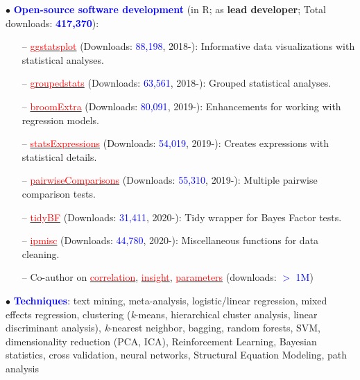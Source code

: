 \documentclass[10pt]{article}
\begin{document}
	$\bullet$ \textcolor{blue}{\textbf{Open-source software development}} (in R; as \textbf{lead developer}; Total downloads: \textcolor{blue}{\textbf{417,370}}):
	 \vspace*{-0.09in}
	 
	\begin{itemize}
	\itemsep-0.1em
	\item[--] \href{https://indrajeetpatil.github.io/ggstatsplot/}{\textcolor{red}{ggstatsplot}} (Downloads: \textcolor{blue}{88,198}, 2018-): Informative data visualizations with statistical analyses.
	\item[--] \href{https://indrajeetpatil.github.io/groupedstats/}{\textcolor{red}{groupedstats}} (Downloads: \textcolor{blue}{63,561}, 2018-): Grouped statistical analyses.
	\item[--] \href{https://indrajeetpatil.github.io/groupedstats/}{\textcolor{red}{broomExtra}} (Downloads: \textcolor{blue}{80,091}, 2019-): Enhancements for working with regression models.
	\item[--] \href{https://indrajeetpatil.github.io/statsExpressions/}{\textcolor{red}{statsExpressions}} (Downloads: \textcolor{blue}{54,019}, 2019-): Creates expressions with statistical details.
	\item[--] \href{https://indrajeetpatil.github.io/pairwiseComparisons/}{\textcolor{red}{pairwiseComparisons}} (Downloads: \textcolor{blue}{55,310}, 2019-): Multiple pairwise comparison tests.
    \item[--] \href{https://indrajeetpatil.github.io/tidyBF/}{\textcolor{red}{tidyBF}} (Downloads: \textcolor{blue}{31,411}, 2020-): Tidy wrapper for Bayes Factor tests.
	\item[--] \href{https://indrajeetpatil.github.io/ipmisc/}{\textcolor{red}{ipmisc}} (Downloads: \textcolor{blue}{44,780}, 2020-): Miscellaneous functions for data cleaning.	
	\item[--] Co-author on \href{https://easystats.github.io/correlation/}{\textcolor{red}{correlation}}, \href{https://easystats.github.io/insight/}{\textcolor{red}{insight}}, \href{https://easystats.github.io/parameters/}{\textcolor{red}{parameters}} (downloads: \textcolor{blue}{$>$ 1M})
	\end{itemize}	

	$\bullet$ \textcolor{blue}{\textbf{Techniques}}: text mining, meta-analysis, logistic/linear regression, mixed effects regression, clustering \hspace*{0.1in}(\textit{k}-means, hierarchical cluster analysis, linear discriminant analysis), \textit{k}-nearest neighbor, bagging, random \hspace*{0.1in}forests, SVM, dimensionality reduction (PCA, ICA), Reinforcement Learning, Bayesian statistics, cross \hspace*{0.1in}validation, neural networks, Structural Equation Modeling, path analysis
	\miniskip
	
\end{document}
